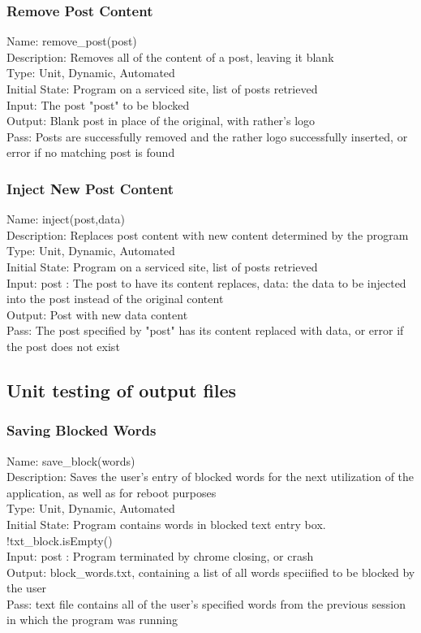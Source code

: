 \documentclass[12pt, titlepage]{article}
\begin{document}
\subsubsection{Remove Post Content}
Name: remove\_post(post) \\
Description: Removes all of the content of a post, leaving it blank \\
Type: Unit, Dynamic, Automated \\
Initial State: Program on a serviced site, list of posts retrieved \\
Input: The post "post" to be blocked \\
Output: Blank post in place of the original, with rather's logo \\
Pass: Posts are successfully removed and the rather logo successfully inserted, or error if no matching post is found \\
\subsubsection{Inject New Post Content}
Name: inject(post,data) \\
Description: Replaces post content with new content determined by the program \\
Type: Unit, Dynamic, Automated \\
Initial State: Program on a serviced site, list of posts retrieved \\
Input: post : The post to have its content replaces, data: the data to be injected into the post instead of the original content \\
Output: Post with new data content \\
Pass: The post specified by "post" has its content replaced with data, or error if the post does not exist \\

		
\subsection{Unit testing of output files}
\subsubsection{Saving Blocked Words}
Name: save\_block(words) \\
Description: Saves the user's entry of blocked words for the next utilization of the application, as well as for reboot purposes \\
Type: Unit, Dynamic, Automated \\
Initial State: Program contains words in blocked text entry box. !txt\_block.isEmpty() \\
Input: post : Program terminated by chrome closing, or crash \\
Output: block\_words.txt, containing a list of all words speciified to be blocked by the user \\
Pass: text file contains all of the user's specified words from the previous session in which the program was running \\
\end{document}
